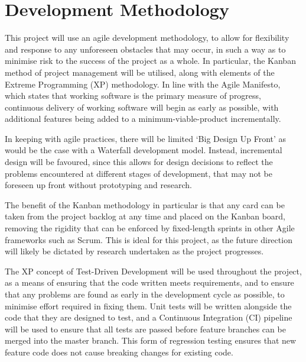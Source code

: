 \section{Development Methodology}\label{sec:development-methodology}

This project will use an agile development methodology, to allow for flexibility and response to any unforeseen obstacles that may occur, in such a way as to minimise risk to the success of the project as a whole. In particular, the Kanban method of project management will be utilised, along with elements of the Extreme Programming (XP) methodology. In line with the Agile Manifesto, which states that working software is the primary measure of progress, continuous delivery of working software will begin as early as possible, with additional features being added to a minimum-viable-product incrementally.

In keeping with agile practices, there will be limited `Big Design Up Front' as would be the case with a Waterfall development model. Instead, incremental design will be favoured, since this allows for design decisions to reflect the problems encountered at different stages of development, that may not be foreseen up front without prototyping and research.

The benefit of the Kanban methodology in particular is that any card can be taken from the project backlog at any time and placed on the Kanban board, removing the rigidity that can be enforced by fixed-length sprints in other Agile frameworks such as Scrum. This is ideal for this project, as the future direction will likely be dictated by research undertaken as the project progresses.

The XP concept of Test-Driven Development will be used throughout the project, as a means of ensuring that the code written meets requirements, and to ensure that any problems are found as early in the development cycle as possible, to minimise effort required in fixing them. Unit tests will be written alongside the code that they are designed to test, and a Continuous Integration (CI) pipeline will be used to ensure that all tests are passed before feature branches can be merged into the master branch. This form of regression testing ensures that new feature code does not cause breaking changes for existing code.